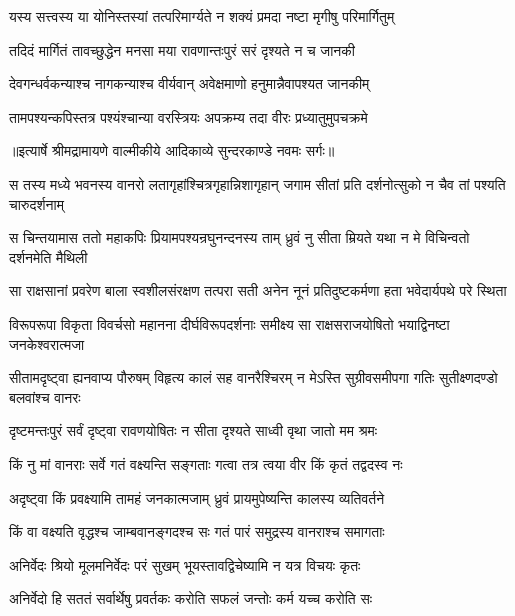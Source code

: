 \twolineshloka
{यस्य सत्त्वस्य या योनिस्तस्यां तत्परिमार्ग्यते}
{न शक्यं प्रमदा नष्टा मृगीषु परिमार्गितुम्} %

\twolineshloka
{तदिदं मार्गितं तावच्छुद्धेन मनसा मया}
{रावणान्तःपुरं सरं दृश्यते न च जानकी} %

\twolineshloka
{देवगन्धर्वकन्याश्च नागकन्याश्च वीर्यवान्}
{अवेक्षमाणो हनुमान्नैवापश्यत जानकीम्} %

\twolineshloka
{तामपश्यन्कपिस्तत्र पश्यंश्चान्या वरस्त्रियः}
{अपक्रम्य तदा वीरः प्रध्यातुमुपचक्रमे} %


{॥इत्यार्षे श्रीमद्रामायणे वाल्मीकीये आदिकाव्ये सुन्दरकाण्डे नवमः सर्गः॥}


\fourlineindentedshloka
{स तस्य मध्ये भवनस्य वानरो}
{लतागृहांश्चित्रगृहान्निशागृहान्}
{जगाम सीतां प्रति दर्शनोत्सुको}
{न चैव तां पश्यति चारुदर्शनाम्} %

\fourlineindentedshloka
{स चिन्तयामास ततो महाकपिः}
{प्रियामपश्यन्रघुनन्दनस्य ताम्}
{ध्रुवं नु सीता म्रियते यथा न मे}
{विचिन्वतो दर्शनमेति मैथिली} %

\fourlineindentedshloka
{सा राक्षसानां प्रवरेण बाला}
{स्वशीलसंरक्षण तत्परा सती}
{अनेन नूनं प्रतिदुष्टकर्मणा}
{हता भवेदार्यपथे परे स्थिता} %

\fourlineindentedshloka
{विरूपरूपा विकृता विवर्चसो}
{महानना दीर्घविरूपदर्शनाः}
{समीक्ष्य सा राक्षसराजयोषितो}
{भयाद्विनष्टा जनकेश्वरात्मजा} %

\fourlineindentedshloka
{सीतामदृष्ट्वा ह्यनवाप्य पौरुषम्}
{विहृत्य कालं सह वानरैश्चिरम्}
{न मेऽस्ति सुग्रीवसमीपगा गतिः}
{सुतीक्ष्णदण्डो बलवांश्च वानरः} %

\twolineshloka
{दृष्टमन्तःपुरं सर्वं दृष्ट्वा रावणयोषितः}
{न सीता दृश्यते साध्वी वृथा जातो मम श्रमः} %

\twolineshloka
{किं नु मां वानराः सर्वे गतं वक्ष्यन्ति सङ्गताः}
{गत्वा तत्र त्वया वीर किं कृतं तद्वदस्व नः} %

\twolineshloka
{अदृष्ट्वा किं प्रवक्ष्यामि तामहं जनकात्मजाम्}
{ध्रुवं प्रायमुपेष्यन्ति कालस्य व्यतिवर्तने} %

\twolineshloka
{किं वा वक्ष्यति वृद्धश्च जाम्बवानङ्गदश्च सः}
{गतं पारं समुद्रस्य वानराश्च समागताः} %

\twolineshloka
{अनिर्वेदः श्रियो मूलमनिर्वेदः परं सुखम्}
{भूयस्तावद्विचेष्यामि न यत्र विचयः कृतः} %

\twolineshloka
{अनिर्वेदो हि सततं सर्वार्थेषु प्रवर्तकः}
{करोति सफलं जन्तोः कर्म यच्च करोति सः} %

